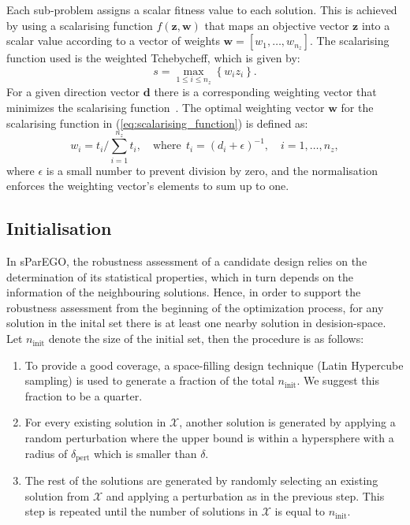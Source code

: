 \documentclass{llncs}
\newcommand{\vz}{\mathbf{z}} %
\newcommand{\vw}{\mathbf{w}} %
\newcommand{\vd}{\mathbf{d}} %
\newcommand{\XSet}{\mathcal{X}} %
\begin{document}
Each sub-problem assigns a scalar fitness value to each solution. This is achieved by using a scalarising function $f(\vz,\vw)$ that maps an objective vector $\vz$ into a scalar value according to a vector of weights $\vw=[w_1,\ldots,w_{n_z}]$. The scalarising function used is the weighted Tchebycheff, which is given by:
\begin{equation}
 s = \max\limits_{1\leq i \leq n_z} \left\{ w_i z_i \right\}.
 \label{eq:scalarising_function}
\end{equation}
For a given direction vector $\vd$ there is a corresponding weighting vector that minimizes the scalarising function~\cite{bib:generational_distance}. The optimal weighting vector $\vw$ for the scalarising function in (\ref{eq:scalarising_function}) is defined as:
\begin{equation}
w_i=t_i \Big/ \sum_{i=1}^{n_z} t_i, \quad \text{where}\ \: t_i = (d_i+\epsilon)^{-1},\quad i=1,\ldots,n_z,
\end{equation}
where $\epsilon$ is a small number to prevent division by zero, and the normalisation enforces the weighting vector's elements to sum up to one.

\subsection{Initialisation}\label{subsec:initialisation}

In sParEGO, the robustness assessment of a candidate design relies on the determination of its statistical properties, which in turn depends on the information of the neighbouring solutions. Hence, in order to support the robustness assessment from the beginning of the optimization process, for any solution in the inital set there is at least one nearby solution in desision-space. Let $n_{\text{init}}$ denote the size of the initial set, then the procedure is as follows:
\begin{enumerate}
 \item To provide a good coverage, a space-filling design technique (Latin Hypercube sampling) is used to generate a fraction of the total $n_{\text{init}}$. We suggest this fraction to be a quarter.
 
 \item For every existing solution in $\XSet$, another solution is generated by applying a random perturbation where the upper bound is within a hypersphere with a radius of $\delta_\text{pert}$ which is smaller than $\delta$.
 
 \item The rest of the solutions are generated by randomly selecting an existing solution from $\XSet$ and applying a perturbation as in the previous step. This step is repeated until the number of solutions in $\XSet$ is equal to $n_{\text{init}}$.
\end{enumerate}
\end{document}
